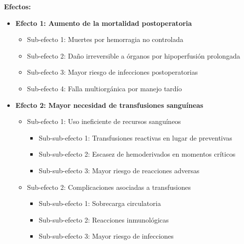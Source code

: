 \vspace{0.5cm}
\textbf{Efectos:}

\begin{itemize}
    \item \textbf{Efecto 1: Aumento de la mortalidad postoperatoria}
    \begin{itemize}
        \item Sub-efecto 1: Muertes por hemorragia no controlada
        \item Sub-efecto 2: Daño irreversible a órganos por hipoperfusión prolongada
        \item Sub-efecto 3: Mayor riesgo de infecciones postoperatorias
        \item Sub-efecto 4: Falla multiorgánica por manejo tardío
    \end{itemize}
    
    \item \textbf{Efecto 2: Mayor necesidad de transfusiones sanguíneas}
    \begin{itemize}
        \item Sub-efecto 1: Uso ineficiente de recursos sanguíneos
        \begin{itemize}
            \item Sub-sub-efecto 1: Transfusiones reactivas en lugar de preventivas
            \item Sub-sub-efecto 2: Escasez de hemoderivados en momentos críticos
            \item Sub-sub-efecto 3: Mayor riesgo de reacciones adversas
        \end{itemize}
        \item Sub-efecto 2: Complicaciones asociadas a transfusiones
        \begin{itemize}
            \item Sub-sub-efecto 1: Sobrecarga circulatoria
            \item Sub-sub-efecto 2: Reacciones inmunológicas
            \item Sub-sub-efecto 3: Mayor riesgo de infecciones
        \end{itemize}
    \end{itemize}
    

\end{itemize}
